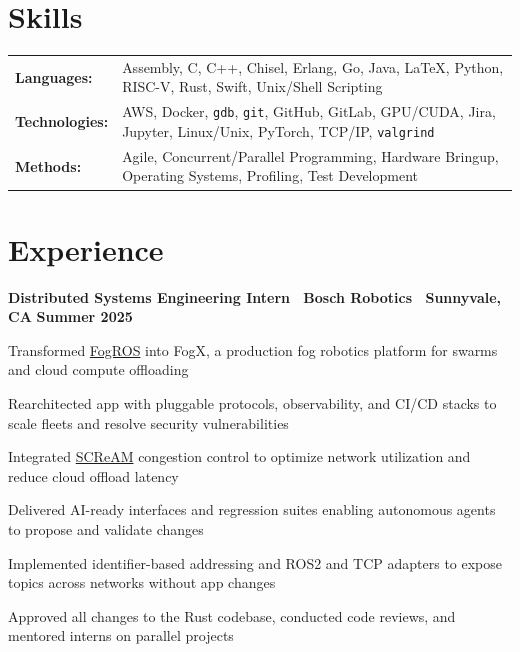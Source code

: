 \documentclass[10pt]{article}
\newenvironment{mylist}[1][]
{\itemize[nosep, wide=0pt, leftmargin=*, after=\strut]}
{\enditemize}
\begin{document}

\section{Skills}
\begin{tabularx}{\linewidth}{@{}l X@{}}
    \textbf{Languages:} & Assembly, C, C++, Chisel, Erlang, Go, Java, \LaTeX, Python, RISC-V, Rust, Swift, Unix/Shell Scripting \\
    \textbf{Technologies:} & AWS, Docker, \texttt{gdb}, \texttt{git}, GitHub, GitLab, GPU/CUDA, Jira, Jupyter, Linux/Unix, PyTorch, TCP/IP, \texttt{valgrind} \\
    \textbf{Methods:} & Agile, Concurrent/Parallel Programming, Hardware Bringup, Operating Systems, Profiling, Test Development
\end{tabularx}


\section{Experience}

\begin{minipage}[t]{\linewidth}
    \textbf{Distributed Systems Engineering Intern \textbar \ Bosch Robotics \textbar \ Sunnyvale, CA} \hfill \textbf{Summer 2025} 
    \begin{mylist}
        \item Transformed \href{https://github.com/BerkeleyAutomation/FogROS2}{FogROS} into FogX, a production fog robotics platform for swarms and cloud compute offloading
        \item Rearchitected app with pluggable protocols, observability, and CI/CD stacks to scale fleets and resolve security vulnerabilities
        \item Integrated \href{https://datatracker.ietf.org/doc/draft-johansson-ccwg-rfc8298bis-screamv2/}{SCReAM} congestion control to optimize network utilization and reduce cloud offload latency
        \item Delivered AI-ready interfaces and regression suites enabling autonomous agents to propose and validate changes
        \item Implemented identifier-based addressing and ROS2 and TCP adapters to expose topics across networks without app changes 
        \item Approved all changes to the Rust codebase, conducted code reviews, and mentored interns on parallel projects
    \end{mylist}
\end{minipage}
\end{document}
